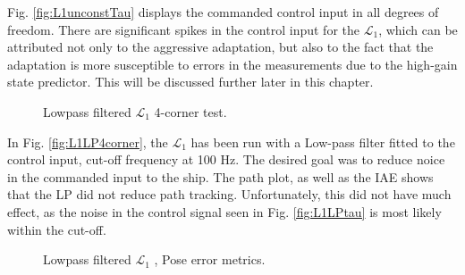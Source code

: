 Fig. \ref{fig:L1unconstTau} displays the commanded control input in all degrees of freedom. There are significant spikes in the control input for the $\mathcal{L}_1$, which can be attributed not only to the aggressive adaptation, but also to the fact that the adaptation is more susceptible to errors in the measurements due to the high-gain state predictor. This will be discussed further later in this chapter. 


\begin{figure}[!h]
    \centering
    \caption{Lowpass filtered $\mathcal{L}_1$ 4-corner test. }
\end{figure}\label{fig:L1LP4corner}

In Fig. \ref{fig:L1LP4corner}, the $\mathcal{L}_1$ has been run with a Low-pass filter fitted to the control input, cut-off frequency at 100 Hz. The desired goal was to reduce noice in the commanded input to the ship. The path plot, as well as the IAE shows that the LP did not reduce path tracking.  Unfortunately, this did not have much effect, as the noise in the control signal seen in Fig. \ref{fig:L1LPtau} is most likely within the cut-off. 

\begin{figure}[!h]
    \centering
    \caption{Lowpass filtered $\mathcal{L}_1$ , Pose error metrics. }
\end{figure}\label{fig:L1LPMetrics}


